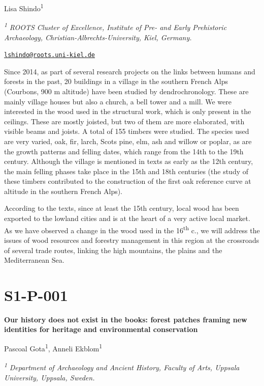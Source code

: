 \documentclass[
]{book}
\begin{document}
Lisa Shindo\textsuperscript{1}

\textsuperscript{\emph{1}} \emph{ROOTS Cluster of Excellence, Institute of Pre- and Early Prehistoric Archaeology, Christian-Albrechts-University, Kiel, Germany.}

\href{mailto:lshindo@roots.uni-kiel.de}{\nolinkurl{lshindo@roots.uni-kiel.de}}

Since 2014, as part of several research projects on the links between humans and forests in the past, 20 buildings in a village in the southern French Alps (Courbons, 900 m altitude) have been studied by dendrochronology. These are mainly village houses but also a church, a bell tower and a mill. We were interested in the wood used in the structural work, which is only present in the ceilings. These are mostly joisted, but two of them are more elaborated, with visible beams and joists. A total of 155 timbers were studied. The species used are very varied, oak, fir, larch, Scots pine, elm, ash and willow or poplar, as are the growth patterns and felling dates, which range from the 14th to the 19th century. Although the village is mentioned in texts as early as the 12th century, the main felling phases take place in the 15th and 18th centuries (the study of these timbers contributed to the construction of the first oak reference curve at altitude in the southern French Alps).

According to the texts, since at least the 15th century, local wood has been exported to the lowland cities and is at the heart of a very active local market. As we have observed a change in the wood used in the 16\textsuperscript{th} c., we will address the issues of wood resources and forestry management in this region at the crossroads of several trade routes, linking the high mountains, the plains and the Mediterranean Sea.

\hypertarget{s1-p-001}{%
\section*{S1-P-001}\label{s1-p-001}}

\textbf{Our history does not exist in the books: forest patches framing new identities for heritage and environmental conservation}

Pascoal Gota\textsuperscript{1}, Anneli Ekblom\textsuperscript{1}

\textsuperscript{\emph{1}} \emph{Department of Archaeology and Ancient History, Faculty of Arts, Uppsala University, Uppsala, Sweden.}
\end{document}
